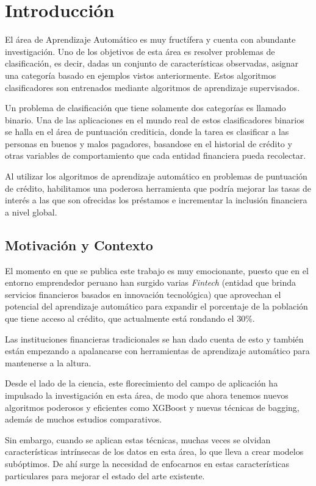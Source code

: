 \chapter{Introducción}

El área de Aprendizaje Automático es muy fructífera y cuenta con abundante investigación. Uno de los objetivos de esta área es resolver problemas de clasificación, es decir, dadas un conjunto de características observadas, asignar una categoría basado en ejemplos vistos anteriormente. Estos algoritmos clasificadores son entrenados mediante algoritmos de aprendizaje supervisados.

Un problema de clasificación que tiene solamente dos categorías es llamado binario. Una de las aplicaciones en el mundo real de estos clasificadores binarios se halla en el área de puntuación crediticia, donde la tarea es clasificar a las personas en buenos y malos pagadores, basandose en el historial de crédito y otras variables de comportamiento que cada entidad financiera pueda recolectar.

Al utilizar los algoritmos de aprendizaje automático en problemas de puntuación de crédito, habilitamos una poderosa herramienta que podría mejorar las tasas de interés a las que son ofrecidas los préstamos e incrementar la inclusión financiera a nivel global.

\section{Motivación y Contexto}

El momento en que se publica este trabajo es muy emocionante, puesto que en el entorno emprendedor peruano han surgido varias \textit{Fintech} (entidad que brinda servicios financieros basados en innovación tecnológica) que aprovechan el potencial del aprendizaje automático para expandir el porcentaje de la población que tiene acceso al crédito, que actualmente está rondando el 30\%.

Las instituciones financieras tradicionales se han dado cuenta de esto y también están empezando a apalancarse con herramientas de aprendizaje automático para mantenerse a la altura.

Desde el lado de la ciencia, este florecimiento del campo de aplicación ha impulsado la investigación en esta área, de modo que ahora tenemos nuevos algoritmos poderosos y eficientes como \ac{XGBoost} y nuevas técnicas de bagging, además de muchos estudios comparativos.

Sin embargo, cuando se aplican estas técnicas, muchas veces se olvidan características intrínsecas de los datos en esta área, lo que lleva a crear modelos subóptimos. De ahí surge la necesidad de enfocarnos en estas características particulares para mejorar el estado del arte existente.

